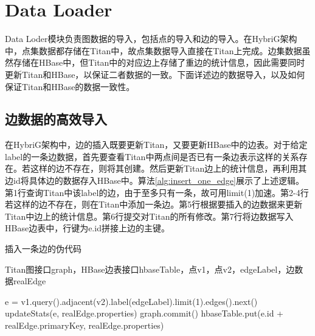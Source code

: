 
\chapter{Data Loader}
Data Loder模块负责图数据的导入，包括点的导入和边的导入。在HybriG架构中，点集数据都存储在Titan中，故点集数据导入直接在Titan上完成。边集数据虽然存储在HBase中，但Titan中的对应边上存储了重边的统计信息，因此需要同时更新Titan和HBase，以保证二者数据的一致。下面详述边的数据导入，以及如何保证Titan和HBase的数据一致性。

\section{边数据的高效导入}
在HybriG架构中，边的插入既要更新Titan，又要更新HBase中的边表。对于给定label的一条边数据，首先要查看Titan中两点间是否已有一条边表示这样的关系存在。若这样的边不存在，则将其创建。然后更新Titan边上的统计信息，再利用其边id将具体边的数据存入HBase中。算法\ref{alg:insert_one_edge}展示了上述逻辑。第1行查询Titan中该label的边，由于至多只有一条，故可用limit(1)加速。第2-4行若这样的边不存在，则在Titan中添加一条边。第5行根据要插入的边数据来更新Titan中边上的统计信息。第6行提交对Titan的所有修改。第7行将边数据写入HBase边表中，行键为e.id拼接上边的主键。
\begin{algorithm}
\caption{插入一条边的伪代码}
\label{alg:insert_one_edge}
\begin{algorithmic}[1] %
\REQUIRE Titan图接口graph，HBase边表接口hbaseTable，点v1，点v2，edgeLabel，边数据realEdge

\STATE e = v1.query().adjacent(v2).label(edgeLabel).limit(1).edges().next()
\ENDIF
\STATE updateStats(e, realEdge.properties)
\STATE graph.commit()
\STATE hbaseTable.put(e.id + realEdge.primaryKey, realEdge.properties)
\end{algorithmic}
\end{algorithm}

